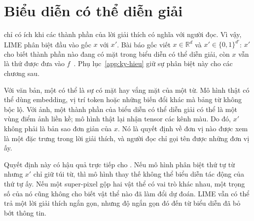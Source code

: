 \section{Biểu diễn có thể diễn giải}
\label{sec:ch03-bieu-dien-de-doc}

%
 chỉ có ích khi các thành phần của lời giải thích có nghĩa với người
đọc. Vì vậy, LIME phân biệt đầu vào gốc $x$ với  $x'$. Bài báo gốc viết $x \in
\mathbb{R}^{d}$ và $x' \in \{0,1\}^{d'}$: $x'$ cho biết thành phần nào đang
có mặt trong biểu diễn có thể diễn giải, còn $x$ vẫn là thứ được đưa vào
$f$~\autocite{p09lime}. Phụ lục~\ref{app:ky-hieu} giữ sự phân biệt này cho các
chương sau.

%
Với văn bản, một  có thể là sự có mặt hay vắng mặt của
một từ. Mô hình thật có thể dùng embedding, vị trí token hoặc những biến đổi
khác mà bảng từ không bộc lộ. Với ảnh, một thành phần của biểu diễn có thể diễn giải
có thể là một vùng điểm ảnh liền kề; mô hình thật lại nhận tensor các kênh màu. Do đó, $x'$
không phải là bản sao đơn giản của $x$. Nó là quyết định về đơn vị nào được
xem là một đặc trưng trong lời giải thích, và người đọc chỉ gọi tên được những
đơn vị ấy.

Quyết định này có hậu quả trực tiếp cho . Nếu mô hình phân biệt
thứ tự từ nhưng $x'$ chỉ giữ túi từ, thì mô hình thay thế không thể biểu diễn
tác động của thứ tự ấy. Nếu một super-pixel gộp hai vật thể có vai trò khác
nhau, một trọng số của nó cũng không cho biết vật thể nào đã làm đổi dự đoán.
LIME vẫn có thể trả một lời giải thích ngắn gọn, nhưng độ ngắn gọn đó đến từ
biểu diễn đã bỏ bớt thông tin.

